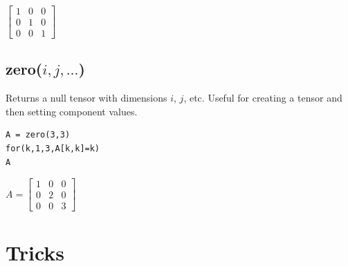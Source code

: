 \documentclass[12pt]{article}
\begin{document}
\noindent
$\displaystyle
\begin{bmatrix}
1 & 0 & 0
\\[1ex]
0 & 1 & 0
\\[1ex]
0 & 0 & 1
\end{bmatrix}
$

\subsection*{zero($i,j,\ldots$)}

Returns a null tensor with dimensions $i$, $j$, etc.
Useful for creating a tensor and then setting component values.

{\color{blue}
\begin{verbatim}
A = zero(3,3)
for(k,1,3,A[k,k]=k)
A
\end{verbatim}
}

\noindent
$\displaystyle
A=
\begin{bmatrix}
1 & 0 & 0
\\[1ex]
0 & 2 & 0
\\[1ex]
0 & 0 & 3
\end{bmatrix}
$

\newpage

\section{Tricks}
\end{document}
